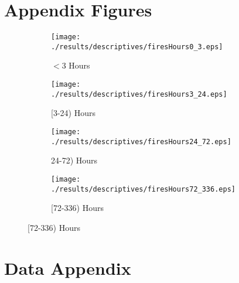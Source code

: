 \documentclass[11pt]{article}
\begin{document}
\section{Appendix Figures} 
\label{app:Figures}
\begin{spacing}{1.3}
\begin{figure}[htpb!]
    \centering
    \caption{Wildfire Exposures by Duration of Fire}
    \label{fig:firesHours}
    \begin{subfigure}{0.45\textwidth}
          \texttt{[image: ./results/descriptives/firesHours0\_3.eps]}
         \caption{$<$3 Hours}
    \end{subfigure}
    \begin{subfigure}{0.45\textwidth}
          \texttt{[image: ./results/descriptives/firesHours3\_24.eps]}
         \caption{[3-24) Hours}
    \end{subfigure}

    \begin{subfigure}{0.45\textwidth}
          \texttt{[image: ./results/descriptives/firesHours24\_72.eps]}
         \caption{24-72) Hours}
    \end{subfigure}
    \begin{subfigure}{0.45\textwidth}
          \texttt{[image: ./results/descriptives/firesHours72\_336.eps]}
         \caption{[72-336) Hours}
    \end{subfigure}
\end{figure}





\clearpage
\setcounter{page}{1}
\renewcommand{\thepage}{C\arabic{page}}
\section{Data Appendix}






\end{spacing}
\end{document}
